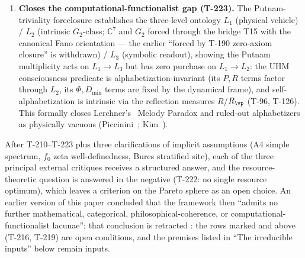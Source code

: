 \begin{enumerate}[leftmargin=2em]
        viable state is strictly dominated on every R\'enyi free
        energy by partial depolarisation, the Pareto set of the
        closure lies on the sphere $P = 2/7$, $F_1$ and $F_\infty$
        are minimised by different spectra, and under unital
        channels there is no terminal object. The earlier
        ``H-MRQT-Lawvere'' statement (the Lawvere fixed point
        $\rhostar = \vp(\Gam)$ as a Pareto-optimum of a 25-monotone
        vector, UHM MRQT-complete) is retracted: T-96 gives
        $\vp(\rhostar_\Omega) \neq \rhostar_\Omega$, and a choice on
        the Pareto sphere needs a weight on the R\'enyi orders that
        neither the self-model nor $\Lind_\Omega$ supplies
        (\S\ref{subsec:extended-closures}).
  \item \textbf{Closes the computational-functionalist gap
        (T-223).} The Putnam-triviality foreclosure establishes the
        three-level ontology $L_1$ (physical vehicle) / $L_2$
        (intrinsic $G_2$-class; $\mathbb{C}^7$ and $G_2$ forced through the
        bridge T15 with the canonical Fano orientation --- the earlier ``forced by
        T-190 zero-axiom closure'' is withdrawn)
        / $L_3$ (symbolic readout), showing the
        Putnam~\cite{putnam1988} multiplicity acts on
        $L_1 \to L_3$ but has zero purchase on $L_1 \to L_2$:
        the UHM consciousness predicate is alphabetization-invariant
        (its $P, R$ terms factor through $L_2$, its $\Phi, D_{\min}$ terms are
        fixed by the dynamical frame), and self-alphabetization is intrinsic via
        the reflection measures $R$/$R_\vp$ (T-96, T-126). This formally closes
        Lerchner's~\cite{lerchner2026abstraction} Melody Paradox and
        ruled-out alphabetizers as physically vacuous
        (Piccinini~\cite{piccinini2008};
        Kim~\cite{kim2005}).
\end{enumerate}

After T-210--T-223 plus three clarifications of implicit
assumptions (A4 simple spectrum, $f_0$ zeta well-definedness, Bures
stratified site), each of the three principal external critiques receives a
structured answer, and the resource-theoretic question is answered in the
negative (T-222: no single resource optimum), which leaves a criterion on the
Pareto sphere as an open choice. An earlier version of this paper concluded
that the framework then ``admits no further mathematical, categorical,
philosophical-coherence, or computational-functionalist lacunae''; that
conclusion is retracted \status{$\times$}: the rows marked  and
 above (T-216, T-219) are open conditions, and the premises listed
in ``The irreducible inputs'' below remain inputs.

